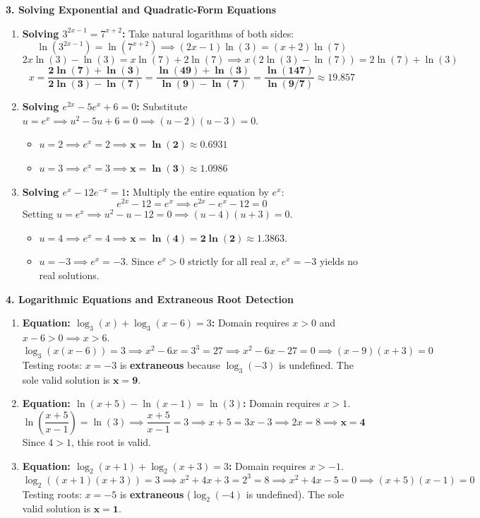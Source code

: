 \textbf{3. Solving Exponential and Quadratic-Form Equations}
\begin{enumerate}
    \item \textbf{Solving $3^{2x - 1} = 7^{x + 2}$:}
    Take natural logarithms of both sides:
    $$\ln(3^{2x - 1}) = \ln(7^{x + 2}) \implies (2x - 1)\ln(3) = (x + 2)\ln(7)$$
    $$2x\ln(3) - \ln(3) = x\ln(7) + 2\ln(7) \implies x(2\ln(3) - \ln(7)) = 2\ln(7) + \ln(3)$$
    $$x = \mathbf{\frac{2\ln(7) + \ln(3)}{2\ln(3) - \ln(7)} = \frac{\ln(49) + \ln(3)}{\ln(9) - \ln(7)} = \frac{\ln(147)}{\ln(9/7)} \approx 19.857}$$
    \item \textbf{Solving $e^{2x} - 5e^x + 6 = 0$:}
    Substitute $u = e^x \implies u^2 - 5u + 6 = 0 \implies (u - 2)(u - 3) = 0$.
    \begin{itemize}
        \item $u = 2 \implies e^x = 2 \implies \mathbf{x = \ln(2) \approx 0.6931}$
        \item $u = 3 \implies e^x = 3 \implies \mathbf{x = \ln(3) \approx 1.0986}$
    \end{itemize}
    \item \textbf{Solving $e^x - 12e^{-x} = 1$:}
    Multiply the entire equation by $e^x$:
    $$e^{2x} - 12 = e^x \implies e^{2x} - e^x - 12 = 0$$
    Setting $u = e^x \implies u^2 - u - 12 = 0 \implies (u - 4)(u + 3) = 0$.
    \begin{itemize}
        \item $u = 4 \implies e^x = 4 \implies \mathbf{x = \ln(4) = 2\ln(2) \approx 1.3863}$.
        \item $u = -3 \implies e^x = -3$. Since $e^x > 0$ strictly for all real $x$, $e^x = -3$ yields no real solutions.
    \end{itemize}
\end{enumerate}

\textbf{4. Logarithmic Equations and Extraneous Root Detection}
\begin{enumerate}
    \item \textbf{Equation: $\log_3(x) + \log_3(x - 6) = 3$:}
    Domain requires $x > 0$ and $x - 6 > 0 \implies x > 6$.
    $$\log_3(x(x - 6)) = 3 \implies x^2 - 6x = 3^3 = 27 \implies x^2 - 6x - 27 = 0 \implies (x - 9)(x + 3) = 0$$
    Testing roots: $x = -3$ is \textbf{extraneous} because $\log_3(-3)$ is undefined.
    The sole valid solution is $\mathbf{x = 9}$.
    \item \textbf{Equation: $\ln(x + 5) - \ln(x - 1) = \ln(3)$:}
    Domain requires $x > 1$.
    $$\ln\left(\frac{x + 5}{x - 1}\right) = \ln(3) \implies \frac{x + 5}{x - 1} = 3 \implies x + 5 = 3x - 3 \implies 2x = 8 \implies \mathbf{x = 4}$$
    Since $4 > 1$, this root is valid.
    \item \textbf{Equation: $\log_2(x + 1) + \log_2(x + 3) = 3$:}
    Domain requires $x > -1$.
    $$\log_2((x + 1)(x + 3)) = 3 \implies x^2 + 4x + 3 = 2^3 = 8 \implies x^2 + 4x - 5 = 0 \implies (x + 5)(x - 1) = 0$$
    Testing roots: $x = -5$ is \textbf{extraneous} ($\log_2(-4)$ is undefined).
    The sole valid solution is $\mathbf{x = 1}$.
\end{enumerate}

